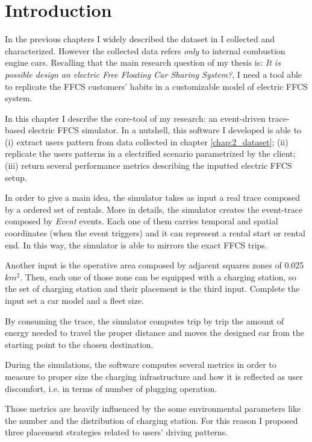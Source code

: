 \section{Introduction}
In the previous chapters I widely described the dataset in I collected and characterized. However the collected data refers \emph{only} to internal combustion engine cars. Recalling that the main research question of my thesis is: \emph{It is possible design an electric Free Floating Car Sharing System?}, I need a tool able to replicate the FFCS customers' habits in a customizable model of electric FFCS system. 

In this chapter I describe the core-tool of my research: an event-driven trace-based electric FFCS simulator. In a nutshell, this software I developed is able to (i)  extract users pattern from data collected in chapter \ref{chap:2_dataset}; (ii) replicate the users patterns in a electrified scenario parametrized by the client; (iii) return several performance metrics describing the inputted electric FFCS setup.

In order to give a main idea, the simulator takes as input a real trace composed by a ordered set of rentals. More in details, the simulator creates the event-trace composed by \emph{Event} events. Each one of them carries temporal and spatial coordinates (when the event triggers) and it can represent a rental start or rental end. In this way, the simulator is able to mirrors the exact FFCS trips. 

Another input is the operative area composed by adjacent squares zones of 0.025 $km^2$. Then, each one of those zone can be equipped with a charging station, so the set of charging station and their placement is the third input. Complete the input set a car model and a fleet size.

By consuming the trace, the simulator computes trip by trip the amount of energy needed to travel the proper distance and moves the designed car from the starting point to the chosen destination. 

During the simulations, the software computes several metrics in order to measure to proper size the charging infrastructure and how it is reflected as user discomfort, i.e. in terms of number of plugging operation.

Those metrics are heavily influenced by the some environmental parameters like the number and the distribution of charging station. For this reason I proposed three placement strategies related to users' driving patterns. 

